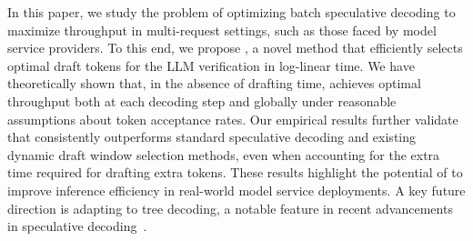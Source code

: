 

In this paper, we study the problem of optimizing batch speculative decoding to maximize throughput in multi-request settings, such as those faced by model service providers.
To this end, we propose \alg{}, a novel method that efficiently selects optimal draft tokens for the LLM verification in log-linear time.
We have theoretically shown that, in the absence of drafting time, \alg{} achieves optimal throughput both at each decoding step and globally under reasonable assumptions about token acceptance rates.
Our empirical results further validate that \alg{} consistently outperforms standard speculative decoding and existing dynamic draft window selection methods, even when accounting for the extra time required for drafting extra tokens. 
These results highlight the potential of \alg{} to improve inference efficiency in real-world model service deployments.
A key future direction is adapting \alg{} to tree decoding, a notable feature in recent advancements in speculative decoding~\citep{cai2024medusa,li2024eagle2,li2024eagle}.
